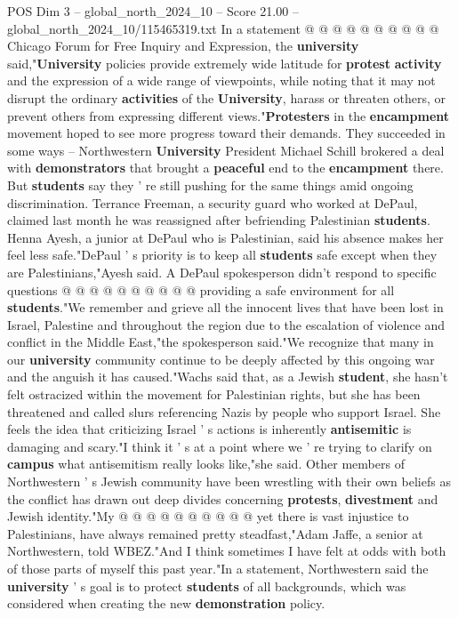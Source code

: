 \begin{textsample}{POS Dim 3 – global\_north\_2024\_10 – Score 21.00 – global\_north\_2024\_10/115465319.txt}
In a statement @ @ @ @ @ @ @ @ @ @ Chicago Forum for Free Inquiry and Expression, the \textbf{university} said,"\textbf{University} policies provide extremely wide latitude for \textbf{protest} \textbf{activity} and the expression of a wide range of viewpoints, while noting that it may not disrupt the ordinary \textbf{activities} of the \textbf{University}, harass or threaten others, or prevent others from expressing different views."\textbf{Protesters} in the \textbf{encampment} movement hoped to see more progress toward their demands.
They succeeded in some ways -- Northwestern \textbf{University} President Michael Schill brokered a deal with \textbf{demonstrators} that brought a \textbf{peaceful} end to the \textbf{encampment} there.
But \textbf{students} say they ' re still pushing for the same things amid ongoing discrimination.
Terrance Freeman, a security guard who worked at DePaul, claimed last month he was reassigned after befriending Palestinian \textbf{students}.
Henna Ayesh, a junior at DePaul who is Palestinian, said his absence makes her feel less safe."DePaul ' s priority is to keep all \textbf{students} safe except when they are Palestinians,"Ayesh said.
A DePaul spokesperson didn't respond to specific questions @ @ @ @ @ @ @ @ @ @ providing a safe environment for all \textbf{students}."We remember and grieve all the innocent lives that have been lost in Israel, Palestine and throughout the region due to the escalation of violence and conflict in the Middle East,"the spokesperson said."We recognize that many in our \textbf{university} community continue to be deeply affected by this ongoing war and the anguish it has caused."Wachs said that, as a Jewish \textbf{student}, she hasn't felt ostracized within the movement for Palestinian rights, but she has been threatened and called slurs referencing Nazis by people who support Israel.
She feels the idea that criticizing Israel ' s actions is inherently \textbf{antisemitic} is damaging and scary."I think it ' s at a point where we ' re trying to clarify on \textbf{campus} what antisemitism really looks like,"she said.
Other members of Northwestern ' s Jewish community have been wrestling with their own beliefs as the conflict has drawn out deep divides concerning \textbf{protests}, \textbf{divestment} and Jewish identity."My @ @ @ @ @ @ @ @ @ @ yet there is vast injustice to Palestinians, have always remained pretty steadfast,"Adam Jaffe, a senior at Northwestern, told WBEZ."And I think sometimes I have felt at odds with both of those parts of myself this past year."In a statement, Northwestern said the \textbf{university} ' s goal is to protect \textbf{students} of all backgrounds, which was considered when creating the new \textbf{demonstration} policy.

\end{textsample}
